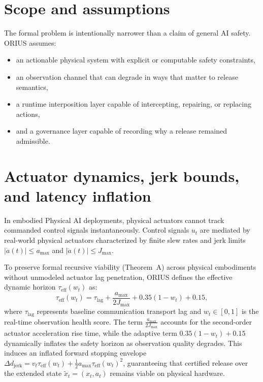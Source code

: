 \section{Scope and assumptions}
The formal problem is intentionally narrower than a claim of general AI safety. ORIUS assumes:
\begin{itemize}
  \item an actionable physical system with explicit or computable safety constraints,
  \item an observation channel that can degrade in ways that matter to release semantics,
  \item a runtime interposition layer capable of intercepting, repairing, or replacing actions,
  \item and a governance layer capable of recording why a release remained admissible.
\end{itemize}

\section{Actuator dynamics, jerk bounds, and latency inflation}
\label{sec:actuator_jerk_bounds}
In embodied Physical AI deployments, physical actuators cannot track commanded control signals
instantaneously. Control signals $u_t$ are mediated by real-world physical actuators characterized by
finite slew rates and jerk limits $|\dot{a}(t)| \le a_{\max}$ and $|\ddot{a}(t)| \le J_{\max}$. 

To preserve formal recursive viability (Theorem~A) across physical embodiments without unmodeled
actuator lag penetration, ORIUS defines the effective dynamic horizon $\tau_{\mathrm{eff}}(w_t)$ as:
\begin{equation}
\label{eq:actuator_effective_latency}
\tau_{\mathrm{eff}}(w_t) = \tau_{\mathrm{lag}} + \frac{a_{\max}}{2 J_{\max}} + 0.35(1 - w_t) + 0.15,
\end{equation}
where $\tau_{\mathrm{lag}}$ represents baseline communication transport lag and $w_t \in [0,1]$ is the
real-time observation health score. The term $\frac{a_{\max}}{2 J_{\max}}$ accounts for the second-order
actuator acceleration rise time, while the adaptive term $0.35(1-w_t) + 0.15$ dynamically inflates the
safety horizon as observation quality degrades. This induces an inflated forward stopping envelope
$\Delta d_{\mathrm{jerk}} = v_t \tau_{\mathrm{eff}}(w_t) + \frac{1}{2} a_{\max} \tau_{\mathrm{eff}}(w_t)^2$,
guaranteeing that certified release over the extended state $\tilde{x}_t = (x_t, a_t)$ remains viable on
physical hardware.

